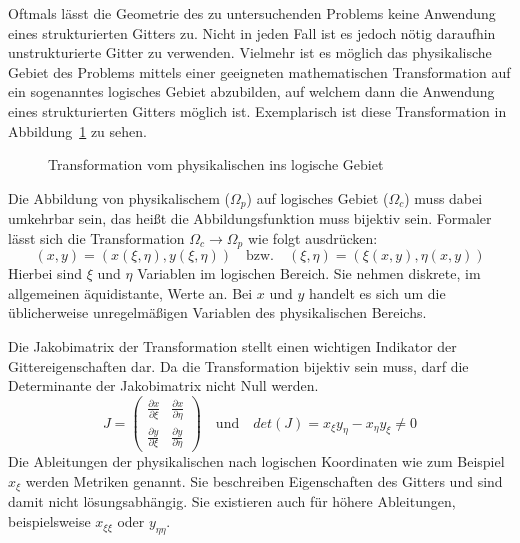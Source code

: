 Oftmals lässt die Geometrie des zu untersuchenden Problems keine Anwendung eines
strukturierten Gitters zu. Nicht in jeden Fall ist es jedoch nötig daraufhin unstrukturierte
Gitter zu verwenden. Vielmehr ist es möglich das physikalische Gebiet des Problems
mittels einer geeigneten mathematischen Transformation auf ein sogenanntes
logisches Gebiet abzubilden, auf welchem dann die Anwendung eines strukturierten Gitters
möglich ist. Exemplarisch ist diese Transformation in Abbildung~\ref{fig:transf} zu sehen.
\begin{figure}[ht]

\centering
\caption{Transformation vom physikalischen ins logische Gebiet}
\label{fig:transf}
\end{figure}
Die Abbildung von physikalischem ($\Omega_p$) auf logisches Gebiet ($\Omega_c$) muss dabei umkehrbar sein, das heißt
die Abbildungsfunktion muss bijektiv sein. Formaler lässt sich die Transformation
$\Omega_c \rightarrow \Omega_p$ wie folgt ausdrücken:
\begin{equation}
  (x,y) = (x(\xi, \eta), y(\xi, \eta)) \quad \text{bzw.} \quad (\xi,\eta) = (\xi(x, y), \eta(x,y))
\end{equation}
Hierbei sind $\xi$ und $\eta$ Variablen im logischen Bereich. Sie nehmen diskrete, im allgemeinen äquidistante,
Werte an. Bei $x$ und $y$ handelt es sich um die üblicherweise unregelmäßigen Variablen des physikalischen Bereichs.

Die Jakobimatrix der Transformation stellt einen wichtigen Indikator der Gittereigenschaften dar.
Da die Transformation bijektiv sein muss, darf die Determinante der Jakobimatrix nicht Null werden.
\begin{equation}
  J = 
  \begin{pmatrix}
    \frac{\partial x}{\partial \xi} & \frac{\partial x}{\partial \eta} \\
    \frac{\partial y}{\partial \xi} & \frac{\partial y}{\partial \eta}
  \end{pmatrix}
  \quad \text{und} \quad
  det (J) = x_{\xi}y_{\eta} - x_{\eta} y_{\xi} \neq 0
  \label{eq:detj}
\end{equation}
Die Ableitungen der physikalischen nach logischen Koordinaten wie
zum Beispiel $x_{\xi}$ werden Metriken genannt. Sie beschreiben Eigenschaften
des Gitters und sind damit nicht lösungsabhängig. Sie existieren auch
für höhere Ableitungen, beispielsweise $x_{\xi\xi}$ oder $y_{\eta\eta}$.

